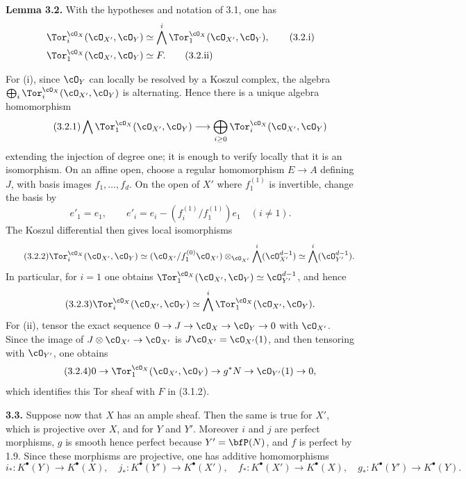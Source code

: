 \textbf{Lemma 3.2.} With the hypotheses and notation of 3.1, one has
\begin{align}
\Tor_i^{\cO_X}(\cO_{X'},\cO_Y)&\simeq
\bigwedge^i\Tor_1^{\cO_X}(\cO_{X'},\cO_Y),\tag{3.2.i}\\
\Tor_1^{\cO_X}(\cO_{X'},\cO_Y)&\simeq F.\tag{3.2.ii}
\end{align}

For (i), since \(\cO_Y\) can locally be resolved by a Koszul complex, the algebra \(\bigoplus_i\Tor_i^{\cO_X}(\cO_{X'},\cO_Y)\) is alternating. Hence there is a unique algebra homomorphism
\begin{equation}\tag{3.2.1}
\bigwedge \Tor_1^{\cO_X}(\cO_{X'},\cO_Y)
\longrightarrow
\bigoplus_{i\ge0}\Tor_i^{\cO_X}(\cO_{X'},\cO_Y)
\end{equation}
extending the injection of degree one; it is enough to verify locally that it is an isomorphism. On an affine open, choose a regular homomorphism \(E\to A\) defining \(J\), with basis images \(f_1,\ldots,f_d\). On the open of \(X'\) where \(f_1^{(1)}\) is invertible, change the basis by
\[
e'_1=e_1,
\qquad
e'_i=e_i-(f_i^{(1)}/f_1^{(1)})e_1\quad(i\ne1).
\]
The Koszul differential then gives local isomorphisms
\begin{equation}\tag{3.2.2}
\Tor_i^{\cO_X}(\cO_{X'},\cO_Y)
\simeq
(\cO_{X'}/f_1^{(0)}\cO_{X'})\otimes_{\cO_{X'}}
\bigwedge^i(\cO_{X'}^{d-1})
\simeq
\bigwedge^i(\cO_{Y'}^{d-1}).
\end{equation}
In particular, for \(i=1\) one obtains \(\Tor_1^{\cO_X}(\cO_{X'},\cO_Y)\simeq \cO_{Y'}^{d-1}\), and hence
\begin{equation}\tag{3.2.3}
\Tor_i^{\cO_X}(\cO_{X'},\cO_Y)
\simeq
\bigwedge^i\Tor_1^{\cO_X}(\cO_{X'},\cO_Y).
\end{equation}
For (ii), tensor the exact sequence \(0\to J\to\cO_X\to\cO_Y\to0\) with \(\cO_{X'}\). Since the image of \(J\otimes\cO_{X'}\to\cO_{X'}\) is \(J\cO_{X'}=\cO_{X'}(1)\), and then tensoring with \(\cO_{Y'}\), one obtains
\begin{equation}\tag{3.2.4}
0\to \Tor_1^{\cO_X}(\cO_{X'},\cO_Y)\to g^*N\to\cO_{Y'}(1)\to0,
\end{equation}
which identifies this Tor sheaf with \(F\) in (3.1.2).

\textbf{3.3.} Suppose now that \(X\) has an ample sheaf. Then the same is true for \(X'\), which is projective over \(X\), and for \(Y\) and \(Y'\). Moreover \(i\) and \(j\) are perfect morphisms, \(g\) is smooth hence perfect because \(Y'=\bfP(N)\), and \(f\) is perfect by 1.9. Since these morphisms are projective, one has additive homomorphisms
\[
i_*:K^\bullet(Y)\to K^\bullet(X),\quad
j_*:K^\bullet(Y')\to K^\bullet(X'),\quad
f_*:K^\bullet(X')\to K^\bullet(X),\quad
g_*:K^\bullet(Y')\to K^\bullet(Y).
\]

